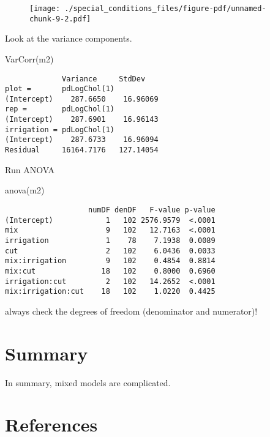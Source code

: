 \documentclass[
  letterpaper,
  DIV=11,
  numbers=noendperiod]{scrreprt}
\newenvironment{Shaded}{\begin{snugshade}}{\end{snugshade}}
\newcommand{\FunctionTok}[1]{\textcolor[rgb]{0.28,0.35,0.67}{#1}}
\newcommand{\NormalTok}[1]{\textcolor[rgb]{0.00,0.23,0.31}{#1}}
\newlength{\cslhangindent}
\newlength{\cslentryspacingunit} %
\newenvironment{CSLReferences}[2] %
 {%
  \setlength{\parindent}{0pt}
  \ifodd #1
  \let\oldpar\par
  \def\par{\hangindent=\cslhangindent\oldpar}
  \fi
  \setlength{\parskip}{#2\cslentryspacingunit}
 }%
 {}
\begin{document}
\begin{figure}[H]

{\centering \texttt{[image: ./special\_conditions\_files/figure-pdf/unnamed-chunk-9-2.pdf]}

}

\end{figure}

Look at the variance components.

\begin{Shaded}
\begin{Highlighting}[]
\FunctionTok{VarCorr}\NormalTok{(m2)}
\end{Highlighting}
\end{Shaded}

\begin{verbatim}
             Variance     StdDev   
plot =       pdLogChol(1)          
(Intercept)    287.6650    16.96069
rep =        pdLogChol(1)          
(Intercept)    287.6901    16.96143
irrigation = pdLogChol(1)          
(Intercept)    287.6733    16.96094
Residual     16164.7176   127.14054
\end{verbatim}

Run ANOVA

\begin{Shaded}
\begin{Highlighting}[]
\FunctionTok{anova}\NormalTok{(m2)}
\end{Highlighting}
\end{Shaded}

\begin{verbatim}
                   numDF denDF   F-value p-value
(Intercept)            1   102 2576.9579  <.0001
mix                    9   102   12.7163  <.0001
irrigation             1    78    7.1938  0.0089
cut                    2   102    6.0436  0.0033
mix:irrigation         9   102    0.4854  0.8814
mix:cut               18   102    0.8000  0.6960
irrigation:cut         2   102   14.2652  <.0001
mix:irrigation:cut    18   102    1.0220  0.4425
\end{verbatim}

always check the degrees of freedom (denominator and numerator)!


\hypertarget{summary}{%
\chapter{Summary}\label{summary}}

In summary, mixed models are complicated.


\hypertarget{references}{%
\chapter*{References}\label{references}}

\hypertarget{refs}{}
\begin{CSLReferences}{0}{0}
\end{CSLReferences}
\end{document}
